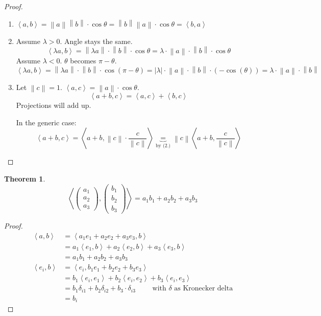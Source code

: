 \documentclass[a4paper]{article}
\newcounter{lecref}[section]
\numberwithin{lecref}{section}
\newtheorem{theorem}[lecref]{Theorem}
\newcommand{\angel}[1]{\left\langle#1\right\rangle}
\newcommand{\norm}[1]{\left\|#1\right\|}
\newcommand{\card}[1]{\left|#1\right|}
\begin{document}
\begin{proof}
  \begin{enumerate}
    \item $\angel{a, b} = \norm a \norm b \cdot \cos\theta = \norm b \norm a \cdot \cos\theta = \angel{b, a}$
    \item
      Assume $\lambda > 0$. Angle stays the same.
      \[ \angel{\lambda a, b} = \norm{\lambda a} \cdot \norm{b} \cdot \cos\theta = \lambda \cdot \norm{a} \cdot \norm{b} \cdot \cos\theta \]
      Assume $\lambda < 0$. $\theta$ becomes $\pi - \theta$.
      \[ \angel{\lambda a, b} = \norm{\lambda a} \cdot \norm{b} \cdot \cos(\pi - \theta) = \card{\lambda} \cdot \norm{a} \cdot \norm{b} \cdot (-\cos(\theta)) = \lambda \cdot \norm a \cdot \norm b \]
    \item
      Let $\norm{c} = 1$. $\angel{a,c} = \norm a \cdot \cos\theta$.
      \[ \angel{a+b, c} = \angel{a,c} + \angel{b,c} \]
      Projections will add up.

      In the generic case:
      \[ \angel{a+b, c} = \angel{a+b, \norm c \cdot \frac{c}{\norm{c}}} \underbrace{=}_{\text{by (2.)}} \norm c \angel{a+b, \frac{c}{\norm{c}}} \]
  \end{enumerate}
\end{proof}

\begin{theorem} %
  \[ \angel{\begin{pmatrix} a_1 \\ a_2 \\ a_3 \end{pmatrix}, \begin{pmatrix} b_1 \\ b_2 \\ b_3 \end{pmatrix}} = a_1 b_1 + a_2 b_2 + a_3 b_3 \]
\end{theorem}

\begin{proof}
  \begin{align*}
    \angel{a,b} &= \angel{a_1 e_1 + a_2 e_2 + a_3 e_3, b} \\
      &= a_1 \angel{e_1, b} + a_2 \angel{e_2, b} + a_3 \angel{e_3, b} \\
      &= a_1 b_1 + a_2 b_2 + a_3 b_3 \\
    \angel{e_i,b} &= \angel{e_i, b_1 e_1 + b_2 e_2 + b_3 e_3} \\
      &= b_1 \angel{e_i, e_1} + b_2 \angel{e_i, e_2} + b_3 \angel{e_i, e_3} \\
      &= b_1 \delta_{i1} + b_2 \delta_{i2} + b_3 \cdot \delta_{i3} \qquad \text{ with } \delta \text{ as Kronecker delta} \\
      &= b_i
  \end{align*}
\end{proof}
\end{document}
